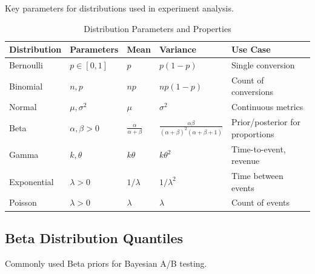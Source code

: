 Key parameters for distributions used in experiment analysis.

\begin{table}[h]
\centering
\caption{Distribution Parameters and Properties}
\small
\begin{tabular}{p{3cm}p{3cm}p{2.5cm}p{2.5cm}p{2.5cm}}
\toprule
\textbf{Distribution} & \textbf{Parameters} & \textbf{Mean} & \textbf{Variance} & \textbf{Use Case} \\
\midrule
Bernoulli & $p \in [0,1]$ & $p$ & $p(1-p)$ & Single conversion \\[0.3cm]
Binomial & $n, p$ & $np$ & $np(1-p)$ & Count of conversions \\[0.3cm]
Normal & $\mu, \sigma^2$ & $\mu$ & $\sigma^2$ & Continuous metrics \\[0.3cm]
Beta & $\alpha, \beta > 0$ & $\frac{\alpha}{\alpha+\beta}$ & $\frac{\alpha\beta}{(\alpha+\beta)^2(\alpha+\beta+1)}$ & Prior/posterior for proportions \\[0.3cm]
Gamma & $k, \theta$ & $k\theta$ & $k\theta^2$ & Time-to-event, revenue \\[0.3cm]
Exponential & $\lambda > 0$ & $1/\lambda$ & $1/\lambda^2$ & Time between events \\[0.3cm]
Poisson & $\lambda > 0$ & $\lambda$ & $\lambda$ & Count of events \\[0.3cm]
\bottomrule
\end{tabular}
\end{table}

\subsection{Beta Distribution Quantiles}

Commonly used Beta priors for Bayesian A/B testing.

